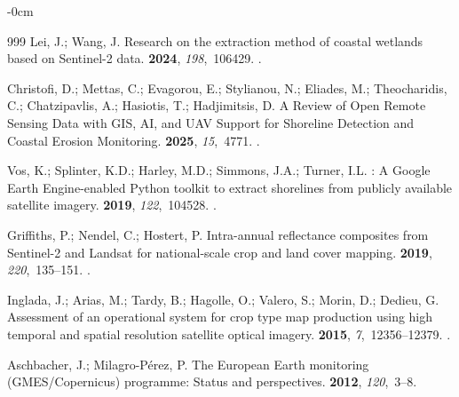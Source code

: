 \documentclass[coasts,article,accept,pdftex,moreauthors]{Definitions/mdpi}
\begin{document}
\begin{adjustwidth}{-\extralength}{0cm}
\begin{thebibliography}{999}
Lei, J.; Wang, J.
\newblock Research on the extraction method of coastal wetlands based on
  {Sentinel-2} data.
 {\bf 2024}, {\em 198},~106429.
.

Christofi, D.; Mettas, C.; Evagorou, E.; Stylianou, N.; Eliades, M.;
  Theocharidis, C.; Chatzipavlis, A.; Hasiotis, T.; Hadjimitsis, D.
\newblock A Review of Open Remote Sensing Data with {GIS}, {AI}, and {UAV}
  Support for Shoreline Detection and Coastal Erosion Monitoring.
 {\bf 2025}, {\em 15},~4771.
.

Vos, K.; Splinter, K.D.; Harley, M.D.; Simmons, J.A.; Turner, I.L.
: {A} {Google Earth Engine}-enabled {Python} toolkit to
  extract shorelines from publicly available satellite imagery.
 {\bf 2019}, {\em 122},~104528.
.

Griffiths, P.; Nendel, C.; Hostert, P.
\newblock Intra-annual reflectance composites from {Sentinel-2} and {Landsat}
  for national-scale crop and land cover mapping.
 {\bf 2019}, {\em 220},~135--151.
.

Inglada, J.; Arias, M.; Tardy, B.; Hagolle, O.; Valero, S.; Morin, D.; Dedieu,
  G.
\newblock Assessment of an operational system for crop type map production
  using high temporal and spatial resolution satellite optical imagery.
 {\bf 2015}, {\em 7},~12356--12379.
.

Aschbacher, J.; Milagro-Pérez, P.
\newblock The European Earth monitoring (GMES/Copernicus) programme: Status and
  perspectives.
 {\bf 2012}, {\em 120},~3--8.


\end{thebibliography}
\end{adjustwidth}
\end{document}
